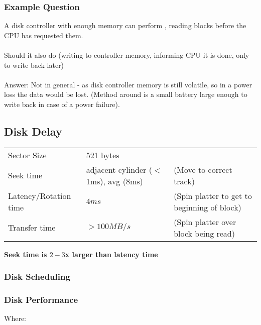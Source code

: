 \documentclass{report}
\begin{document}
\subsubsection*{Example Question}
A disk controller with enough memory can perform , reading blocks before the CPU has requested them.
\\
\\ Should it also do  (writing to controller memory, informing CPU it is done, only to write back later)
\\
\\ Answer: Not in general - as disk controller memory is still volatile, so in a power loss the data would be lost. (Method around is a small battery large enough to write back in case of a power failure).

\subsection*{Disk Delay}
\begin{center}
	\begin{tabular}{l l l}
		Sector Size           & 521 bytes                             &                                             \\
		Seek time             & adjacent cylinder ($<$1ms), avg (8ms) & (Move to correct track)                     \\
		Latency/Rotation time & $4ms$                                 & (Spin platter to get to beginning of block) \\
		Transfer time         & $> 100MB/s$                           & (Spin platter over block being read)        \\
	\end{tabular}
\end{center}
\textbf{Seek time is $2-3$x larger than latency time}
\subsubsection*{Disk Scheduling}
\subsubsection*{Disk Performance}
Where:
\end{document}
